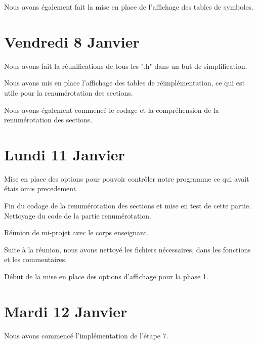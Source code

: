 \documentclass[12pt, a4paper]{article}
\begin{document}
Nous avons également fait la mise en place de l’affichage des tables de symboles.

\section{Vendredi 8 Janvier}

Nous avons fait la réunifications de tous les ".h" dans un but de 
simplification.

Nous avons mis en place l’affichage des tables de r\'eimplémentation, ce qui 
est utile pour la renumérotation des sections.

Nous avons également commencé le codage et la compréhension de la 
renumérotation des sections. 

\section{Lundi 11 Janvier}

Mise en place des options pour pouvoir contrôler notre programme ce qui avait 
étais omis precedement.

Fin du codage de la renumérotation des sections et mise en test de cette partie.
Nettoyage du code de la partie renumérotation.

Réunion de mi-projet avec le corps enseignant.

Suite à la réunion, nous avons nettoyé les fichiers nécessaires, dans les 
fonctions et les commentaires. 

Début de la mise en place des options d'affichage pour la phase 1.


\section{Mardi 12 Janvier}

Nous avons commencé l'implémentation de l'étape 7.
\end{document}
